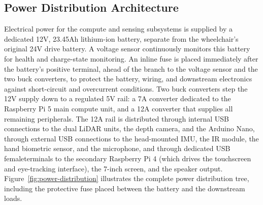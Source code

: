 \subsection{Power Distribution Architecture}
Electrical power for the compute and sensing subsystems is supplied by a dedicated 12V,
23.45Ah lithium-ion battery, separate from the wheelchair's original 24V drive battery. A voltage
sensor continuously monitors this battery for health and charge-state monitoring. An inline fuse
is placed immediately after the battery's positive terminal, ahead of the branch to the voltage
sensor and the two buck converters, to protect the battery, wiring, and downstream electronics
against short-circuit and overcurrent conditions. Two buck
converters step the 12V supply down to a regulated 5V rail: a 7A converter dedicated to the
Raspberry Pi 5 main compute unit, and a 12A converter that supplies all remaining peripherals.
The 12A rail is distributed through internal USB connections to the dual LiDAR units, the depth
camera, and the Arduino Nano, through external USB connections to the head-mounted IMU, the
IR module, the hand biometric sensor, and the microphone, and through dedicated USB femaleterminals to the secondary Raspberry Pi 4 (which drives the touchscreen and eye-tracking
interface), the 7-inch screen, and the speaker output. Figure~\ref{fig:power-distribution} illustrates the complete power
distribution tree, including the protective fuse placed between the battery and the downstream loads.

